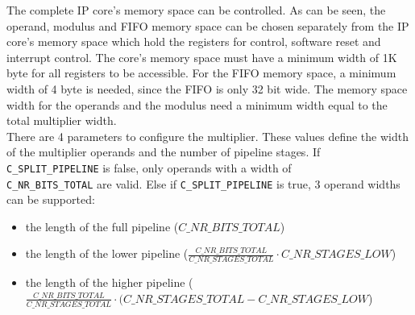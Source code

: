 The complete IP core's memory space can be controlled. As can be seen, the operand, modulus and FIFO memory space can be
chosen separately from the IP core's memory space which hold the registers for control, software reset and interrupt
control. The core's memory space must have a minimum width of 1K byte for all registers to be accessible. For the FIFO
memory space, a minimum width of 4 byte is needed, since the FIFO is only 32 bit wide. The memory space width for the
operands and the modulus need a minimum width equal to the total multiplier width.\\

There are 4 parameters to configure the multiplier. These values define the width of the multiplier operands and the
number of pipeline stages. If \verb|C_SPLIT_PIPELINE| is false, only operands with a width of\\\verb|C_NR_BITS_TOTAL| are
valid. Else if \verb|C_SPLIT_PIPELINE| is true, 3 operand widths can be supported:
\begin{itemize}
  \item the length of the full pipeline ($C\_NR\_BITS\_TOTAL$)
  \item the length of the lower pipeline ($\frac{C\_NR\_BITS\_TOTAL}{C\_NR\_STAGES\_TOTAL} \cdot C\_NR\_STAGES\_LOW $)
  \item the length of the higher pipeline ($\frac{C\_NR\_BITS\_TOTAL}{C\_NR\_STAGES\_TOTAL} \cdot (C\_NR\_STAGES\_TOTAL - C\_NR\_STAGES\_LOW$)
\end{itemize}

